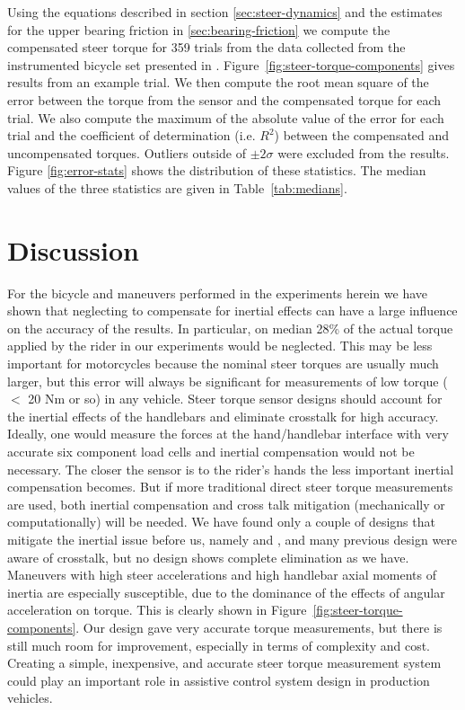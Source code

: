 \documentclass[10pt]{article}
\begin{document}
Using the equations described in section \ref{sec:steer-dynamics} and the
estimates for the upper bearing friction in \ref{sec:bearing-friction} we
compute the compensated steer torque for 359 trials from the data collected
from the instrumented bicycle set presented in \cite{Moore2012}.
Figure~\ref{fig:steer-torque-components} gives results from an example trial.
We then compute the root mean square of the error between the torque from the
sensor and the compensated torque for each trial. We also compute the maximum
of the absolute value of the error for each trial and the coefficient of
determination (i.e. $R^2$) between the compensated and uncompensated torques.
Outliers outside of $\pm2 \sigma$ were excluded from the results. Figure
\ref{fig:error-stats} shows the distribution of these statistics. The median
values of the three statistics are given in Table~\ref{tab:medians}.

\section*{Discussion}

For the bicycle and maneuvers performed in the experiments herein we have shown
that neglecting to compensate for inertial effects can have a large influence
on the accuracy of the results. In particular, on median 28\% of the actual
torque applied by the rider in our experiments would be neglected. This may be
less important for motorcycles because the nominal steer torques are usually
much larger, but this error will always be significant for measurements of low
torque ($<$ 20 Nm or so) in any vehicle. Steer torque sensor designs should
account for the inertial effects of the handlebars and eliminate crosstalk for
high accuracy. Ideally, one would measure the forces at the hand/handlebar
interface with very accurate six component load cells and inertial compensation
would not be necessary. The closer the sensor is to the rider's hands the less
important inertial compensation becomes. But if more traditional direct steer
torque measurements are used, both inertial compensation and cross talk
mitigation (mechanically or computationally) will be needed. We have found only
a couple of designs that mitigate the inertial issue before us, namely
\cite{Evertse2010} and \cite{Iuchi2006}, and many previous design were aware of
crosstalk, but no design shows complete elimination as we have. Maneuvers with
high steer accelerations and high handlebar axial moments of inertia are
especially susceptible, due to the dominance of the effects of angular
acceleration on torque. This is clearly shown in
Figure~\ref{fig:steer-torque-components}. Our design gave very accurate torque
measurements, but there is still much room for improvement, especially in terms
of complexity and cost. Creating a simple, inexpensive, and accurate steer
torque measurement system could play an important role in assistive control
system design in production vehicles.
\end{document}
